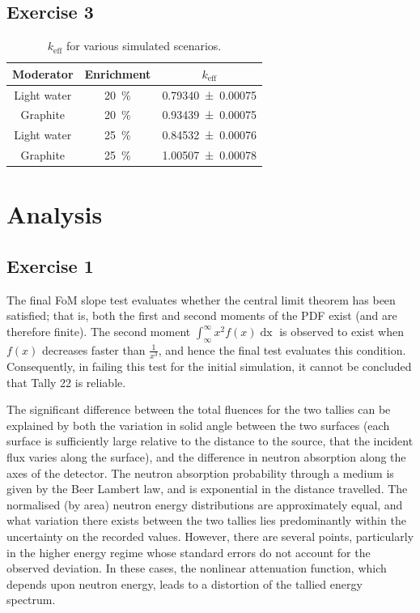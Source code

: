 \documentclass{article}
\begin{document}
  \subsection{Exercise 3}
    \begin{table}[htb!]
    \centering
    \caption{$k_{\text{eff}}$ for various simulated scenarios.}
    \label{table:reactivities}
    \begin{tabular}{@{}ccc@{}}
    \toprule
    Moderator & Enrichment & $k_{\text{eff}}$
    \\
    \midrule
    Light water        & \SI{20}{\percent} &  \num{0.79340 \pm 0.00075} \\
    Graphite           & \SI{20}{\percent} &  \num{0.93439 \pm 0.00075} \\
    Light water        & \SI{25}{\percent} &  \num{0.84532 \pm 0.00076} \\
    Graphite           & \SI{25}{\percent} &  \num{1.00507 \pm 0.00078} \\
    \bottomrule
    \end{tabular}
    \end{table}
    \FloatBarrier


\section{Analysis}
  \subsection{Exercise 1}
    The final FoM slope test evaluates whether the central limit theorem has been satisfied; that is, both the first and second moments of the PDF exist (and are therefore finite). The second moment $\int_{\infty}^{\infty}{x^2f(x)\operatorname{dx}}$ is observed to exist when $f(x)$ decreases faster than $\frac{1}{x^3}$, and hence the final test evaluates this condition. Consequently, in failing this test for the initial simulation, it cannot be concluded that Tally 22 is reliable.

    The significant difference between the total fluences for the two tallies can be explained by both the variation in solid angle between the two surfaces (each surface is sufficiently large relative to the distance to the source, that the incident flux varies along the surface), and the difference in neutron absorption along the axes of the detector. The neutron absorption probability through a medium is given by the Beer Lambert law, and is exponential in the distance travelled.
    The normalised (by area) neutron energy distributions are approximately equal, and what variation there exists between the two tallies lies predominantly within the uncertainty on the recorded values. However, there are several points, particularly in the higher energy regime whose standard errors do not account for the observed deviation. In these cases, the nonlinear attenuation function, which depends upon neutron energy, leads to a distortion of the tallied energy spectrum.
\end{document}
